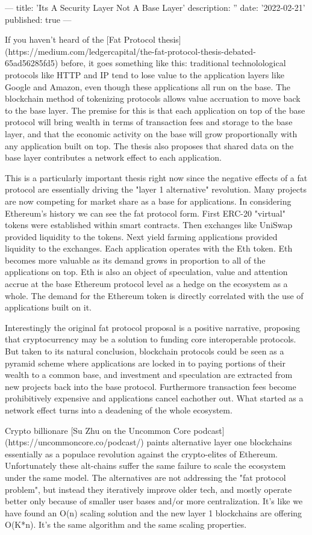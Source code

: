 ---
title: 'Its A Security Layer Not A Base Layer'
description: ''
date: '2022-02-21'
published: true
---

If you haven't heard of the [Fat Protocol thesis](https://medium.com/ledgercapital/the-fat-protocol-thesis-debated-65ad56285fd5) before, it goes something like this: traditional technolological protocols like HTTP and IP tend to lose value to the application layers like Google and Amazon, even though these applications all run on the base. The blockchain method of tokenizing protocols allows value accruation to move back to the base layer. The premise for this is that each application on top of the base protocol will bring wealth in terms of transaction fees and storage to the base layer, and that the economic activity on the base will grow proportionally with any application built on top. The thesis also proposes that shared data on the base layer contributes a network effect to each application.

This is a particularly important thesis right now since the negative effects of a fat protocol are essentially driving the "layer 1 alternative" revolution. Many projects are now competing for market share as a base for applications. In considering Ethereum's history we can see the fat protocol form. First ERC-20 "virtual" tokens were established within smart contracts. Then exchanges like UniSwap provided liquidity to the tokens. Next yield farming applications provided liquidity to the exchanges. Each application operates with the Eth token. Eth becomes more valuable as its demand grows in proportion to all of the applications on top. Eth is also an object of speculation, value and attention accrue at the base Ethereum protocol level as a hedge on the ecosystem as a whole. The demand for the Ethereum token is directly correlated with the use of applications built on it.

Interestingly the original fat protocol proposal is a positive narrative, proposing that cryptocurrency may be a solution to funding core interoperable protocols. But taken to its natural conclusion, blockchain protocols could be seen as a pyramid scheme where applications are locked in to paying portions of their wealth to a common base, and investment and speculation are extracted from new projects back into the base protocol. Furthermore transaction fees become prohibitively expensive and applications cancel eachother out. What started as a network effect turns into a deadening of the whole ecosystem.

Crypto billionare [Su Zhu on the Uncommon Core podcast](https://uncommoncore.co/podcast/) paints alternative layer one blockchains essentially as a populace revolution against the crypto-elites of Ethereum. Unfortunately these alt-chains suffer the same failure to scale the ecosystem under the same model. The alternatives are not addressing the "fat protocol problem", but instead they iteratively improve older tech, and mostly operate better only because of smaller user bases and/or more centralization. It's like we have found an O(n) scaling solution and the new layer 1 blockchains are offering O(K*n). It's the same algorithm and the same scaling properties.

